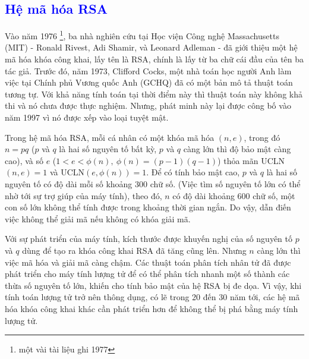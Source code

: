 \textcolor{blue}{\section{Hệ mã hóa RSA}}
Vào năm 1976 \footnote{một vài tài liệu ghi 1977}, ba nhà nghiên cứu tại Học viện Công nghệ Massachusetts (MIT) - Ronald Rivest, Adi
Shamir, và Leonard Adleman - đã giới thiệu một hệ mã hóa khóa công khai, lấy tên là RSA, chính là lấy từ ba chữ cái đầu của tên ba tác giả.
Trước đó, năm 1973, Clifford Cocks, một nhà toán học người Anh làm việc tại Chính phủ Vương quốc Anh (GCHQ)
đã có một bản mô tả thuật toán tương tự. Với khả năng tính toán tại thời điểm
này thì thuật toán này không khả thi và nó chưa được thực nghiệm. Nhưng, phát
minh này lại được công bố vào năm 1997 vì nó được xếp vào loại tuyệt mật.

Trong hệ mã hóa RSA, mỗi cá nhân có một khóa mã hóa $(n, e)$, trong đó $n = pq$ ($p$ và $q$ là hai số nguyên tố bất kỳ, $p$ và $q$ càng lớn thì độ bảo mật càng cao),
và số $e$ ($1 < e < \phi(n),\ \phi(n) =(p-1)(q-1)$) thỏa mãn UCLN$(n,e) = 1$ và UCLN$(e,\phi(n)) = 1$. Để có tính bảo mật cao, $p$ và $q$ là hai số nguyên tố có độ dài mỗi số khoảng 300 chữ số.
(Việc tìm số nguyên tố lớn có thể nhờ tới sự trợ giúp của máy tính), theo đó, $n$ có độ dài khoảng 600 chữ số, một con số lớn không thể tính được trong khoảng thời gian ngắn.
Do vậy, dẫn điến việc không thể giải mã nếu không có khóa giải mã. \\

\begin{remark}
    Với sự phát triển của máy tính, kích thước được khuyến nghị của
    số nguyên tố $p$ và $q$ dùng để tạo ra khóa công khai RSA đã tăng cũng
    lên. Nhưng $n$ càng lớn thì việc mã hóa và giải mã càng chậm.
    Các thuật toán phân tích nhân tử đã được phát triển cho máy tính lượng tử để có thể phân tích nhanh một số thành các thừa số nguyên tố lớn, khiến cho tính bảo mật của hệ RSA bị đe dọa.
    Vì vậy, khi tính toán lượng tử trở
    nên thông dụng, có lẽ trong 20 đến 30 năm tới, các hệ mã hóa khóa công
    khai khác cần phát triển hơn để không thể bị phá bằng máy tính lượng tử.
\end{remark}
